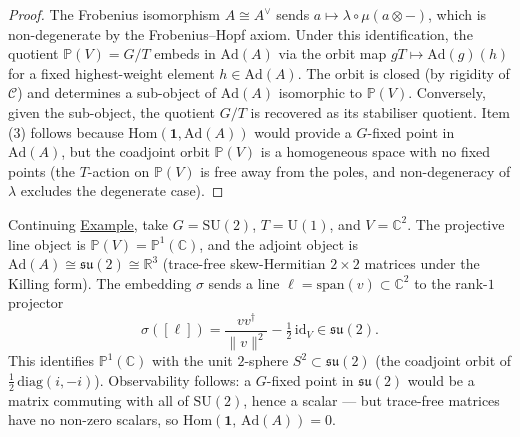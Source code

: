 \begin{proof}
The Frobenius isomorphism $A \cong A^{\vee}$ sends $a \mapsto \lambda \circ
\mu(a \otimes -)$, which is non-degenerate by the Frobenius--Hopf axiom.
Under this identification, the quotient $\mathbb{P}(V) = G/T$ embeds
in $\mathrm{Ad}(A)$ via the orbit map $gT \mapsto \mathrm{Ad}(g)(h)$ for a
fixed highest-weight element $h \in \mathrm{Ad}(A)$. The orbit is closed
(by rigidity of $\mathcal{C}$) and determines a sub-object of
$\mathrm{Ad}(A)$ isomorphic to $\mathbb{P}(V)$. Conversely, given the
sub-object, the quotient $G/T$ is recovered as its stabiliser quotient. Item
(3) follows because $\mathrm{Hom}(\mathbf{1}, \mathrm{Ad}(A))$ would provide
a $G$-fixed point in $\mathrm{Ad}(A)$, but the coadjoint orbit
$\mathbb{P}(V)$ is a homogeneous space with no fixed points (the $T$-action
on $\mathbb{P}(V)$ is free away from the poles, and non-degeneracy of
$\lambda$ excludes the degenerate case).
\end{proof}

\begin{example}
  \label{ex:fiber-adjoint-su2}
Continuing \hyperref[ex:projective-line-su2]{Example}, take
$G = \mathrm{SU}(2)$, $T = \mathrm{U}(1)$, and
$V = \mathbb{C}^2$. The projective line object is
$\mathbb{P}(V) = \mathbb{P}^1(\mathbb{C})$, and the adjoint object is
$\mathrm{Ad}(A) \cong \mathfrak{su}(2) \cong \mathbb{R}^3$
(trace-free skew-Hermitian $2 \times 2$ matrices under the Killing
form). The embedding $\sigma$ sends a line
$\ell = \mathrm{span}(v) \subset \mathbb{C}^2$ to the rank-$1$
projector
\[
\sigma([\ell]) =
  \frac{v v^{\dagger}}{\lVert v \rVert^2}
  - \tfrac{1}{2}\,\mathrm{id}_V
  \in \mathfrak{su}(2).
\]
This identifies $\mathbb{P}^1(\mathbb{C})$ with the unit $2$-sphere
$S^2 \subset \mathfrak{su}(2)$ (the coadjoint orbit of
$\tfrac{1}{2}\,\mathrm{diag}(i, -i)$). Observability follows:
a $G$-fixed point in $\mathfrak{su}(2)$ would be a matrix commuting
with all of $\mathrm{SU}(2)$, hence a scalar --- but trace-free matrices
have no non-zero scalars, so
$\mathrm{Hom}(\mathbf{1},\, \mathrm{Ad}(A)) = 0$.
\end{example}

